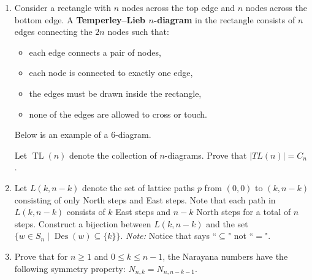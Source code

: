 \documentclass[11pt]{article}
\theoremstyle{definition}
\DeclareMathOperator{\Des}{Des}
\DeclareMathOperator{\TL}{TL}
\begin{document}
\begin{enumerate}
\begin{enumerate}
\newpage

\item Consider a rectangle with $n$ nodes across the top edge and $n$ nodes across the bottom edge.  A \textbf{Temperley--Lieb $n$-diagram} in the rectangle consists of $n$ edges connecting the $2n$ nodes such that:
\begin{itemize}
\item each edge connects a pair of nodes,
\item each node is connected to exactly one edge,
\item the edges must be drawn inside the rectangle,
\item none of the edges are allowed to cross or touch.
\end{itemize}
Below is an example of a 6-diagram.

\begin{center}
\end{center}
Let $\TL(n)$ denote the collection of $n$-diagrams. Prove that $|TL(n)|=C_n$.


\item Let $L(k,n-k)$ denote the set of lattice paths $p$ from $(0,0)$ to $(k,n-k)$ consisting of only North steps and East steps. Note that each path in $L(k,n-k)$ consists of $k$ East steps and $n-k$ North steps for a total of $n$ steps. Construct a bijection between $L(k,n-k)$ and the set $\{w\in S_n\mid \Des(w)\subseteq \{k\}\}$. \emph{Note:} Notice that says ``$\subseteq$" not ``$=$".

\item Prove that for $n\geq 1$ and $0\leq k\leq n-1$, the Narayana numbers have the following symmetry property: $N_{n,k}=N_{n,n-k-1}$.


\end{enumerate}
\end{enumerate}
\end{document}

